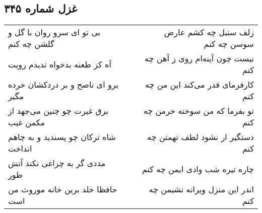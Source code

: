 \begin{center}
\section*{غزل شماره ۳۴۵}
\label{sec:sh345}
\begin{longtable}{l p{0.5cm} r}
بی تو ای سرو روان با گل و گلشن چه کنم
&&
زلف سنبل چه کشم عارض سوسن چه کنم
\\
آه کز طعنه بدخواه ندیدم رویت
&&
نیست چون آینه‌ام روی ز آهن چه کنم
\\
برو ای ناصح و بر دردکشان خرده مگیر
&&
کارفرمای قدر می‌کند این من چه کنم
\\
برق غیرت چو چنین می‌جهد از مکمن غیب
&&
تو بفرما که من سوخته خرمن چه کنم
\\
شاه ترکان چو پسندید و به چاهم انداخت
&&
دستگیر ار نشود لطف تهمتن چه کنم
\\
مددی گر به چراغی نکند آتش طور
&&
چاره تیره شب وادی ایمن چه کنم
\\
حافظا خلد برین خانه موروث من است
&&
اندر این منزل ویرانه نشیمن چه کنم
\\
\end{longtable}
\end{center}
